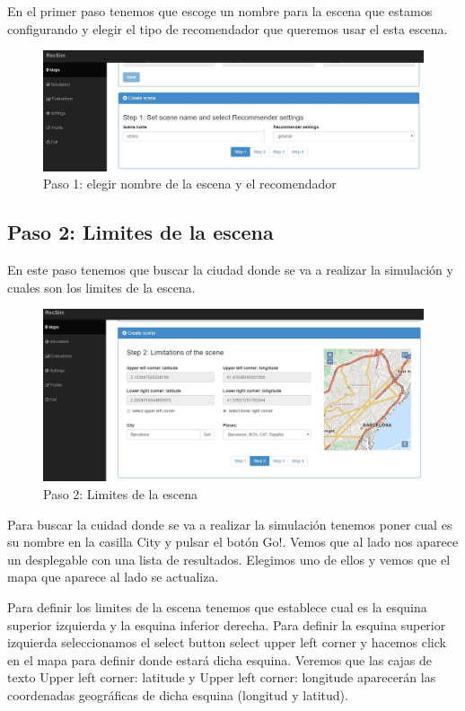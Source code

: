 En el primer paso tenemos que escoge un nombre para la escena que estamos configurando y elegir el tipo de recomendador que queremos usar el esta escena.

\begin{figure}[H]
	\centering\includegraphics[scale=0.35]{imagenes/capitulo9/crear-escena-1.JPG}
	\caption{Paso 1: elegir nombre de la escena y el recomendador}
	\label{img:paso1}
\end{figure}

\subsection{Paso 2: Limites de la escena}

En este paso tenemos que buscar la ciudad donde se va a realizar la simulación y cuales son los limites de la escena.

\begin{figure}[H]
	\centering\includegraphics[scale=0.35]{imagenes/capitulo9/crear-escena-2.JPG}
	\caption{Paso 2: Limites de la escena}
	\label{img:paso2}
\end{figure}

Para buscar la cuidad donde se va a realizar la simulación tenemos poner cual es su nombre en la casilla City y pulsar el botón Go!. Vemos que al lado nos aparece un desplegable con una lista de resultados. Elegimos uno de ellos y vemos que el mapa que aparece al lado se actualiza.

Para definir los limites de la escena tenemos que establece cual es la esquina superior izquierda y la esquina inferior derecha. Para definir la esquina superior izquierda seleccionamos el select button select upper left corner y hacemos click en el mapa para definir donde estará dicha esquina. Veremos que las cajas de texto Upper left corner: latitude y Upper left corner: longitude aparecerán las coordenadas geográficas de dicha esquina (longitud y latitud).

